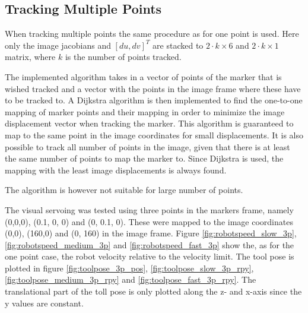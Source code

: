 \subsection{Tracking Multiple Points}

When tracking multiple points the same procedure as for one point is used.
Here only the image jacobians and $[du, dv]^T$ are stacked to $2 \cdot k \times 6$ and $2 \cdot k \times 1$ matrix, where $k$ is the number of points tracked.

The implemented algorithm takes in a vector of points of the marker that is wished tracked and a vector with the points in the image frame where these have to be tracked to.
A Dijkstra algorithm is then implemented to find the one-to-one mapping of marker points and their mapping in order to minimize the image displacement vector when tracking the marker.
This algorithm is guaranteed to map to the same point in the image coordinates for small displacements.
It is also possible to track all number of points in the image, given that there is at least the same number of points to map the marker to.
Since Dijkstra is used, the mapping with the least image displacements is always found.

The algorithm is however not suitable for large number of points.


The visual servoing was tested using three points in the markers frame, namely (0,0,0), (0.1, 0, 0) and (0, 0.1, 0).
These were mapped to the image coordinates (0,0), (160,0) and (0, 160) in the image frame.
Figure \ref{fig:robotspeed_slow_3p}, \ref{fig:robotspeed_medium_3p} and \ref{fig:robotspeed_fast_3p} show the, as for the one point case, the robot velocity relative to the velocity limit.
The tool pose is plotted in figure \ref{fig:toolpose_3p_pos}, \ref{fig:toolpose_slow_3p_rpy}, \ref{fig:toolpose_medium_3p_rpy} and \ref{fig:toolpose_fast_3p_rpy}.
The translational part of the toll pose is only plotted along the z- and x-axis since the y values are constant.

